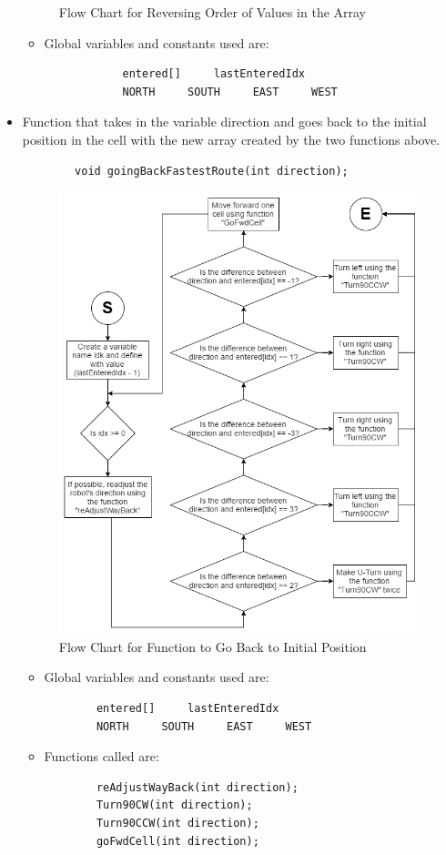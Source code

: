 \documentclass[11pt]{article}
\begin{document}
\begin{itemize}
\begin{figure}[htp]
\caption{Flow Chart for Reversing Order of Values in the Array}
\label{}
\end{figure}
	\begin{itemize}
	\item Global variables and constants used are:
 		\begin{verbatim}
			entered[]     lastEnteredIdx
			NORTH     SOUTH     EAST     WEST
		\end{verbatim}
	\end{itemize}
\item Function that takes in the variable direction and goes back to the initial position in the cell with the new array created by the two functions above.
 	\begin{verbatim}
		void goingBackFastestRoute(int direction);
	\end{verbatim}
\begin{figure}[htp]
\centering
\includegraphics[scale=0.53]{images/Software_Flowchart/goingBackFastestRoute.png}
\caption{Flow Chart for Function to Go Back to Initial Position}
\label{}
\end{figure}
	\begin{itemize}
	\item Global variables and constants used are:
	\begin{verbatim}
		entered[]     lastEnteredIdx
		NORTH     SOUTH     EAST     WEST
	\end{verbatim}
	\item Functions called are:
	\begin{verbatim}
		reAdjustWayBack(int direction);	
		Turn90CW(int direction);
		Turn90CCW(int direction);
		goFwdCell(int direction);
	\end{verbatim}
	\end{itemize}
\end{itemize}
\end{document}
